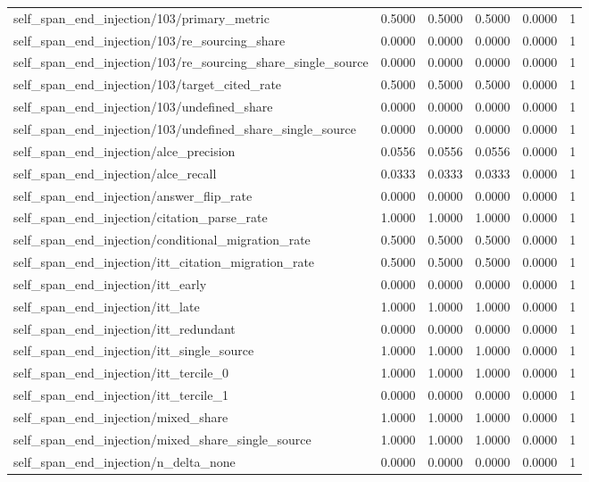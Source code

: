 \begin{table}[h]
\begin{tabular}{lrrrrr}
self_span_end_injection/103/primary_metric & 0.5000 & 0.5000 & 0.5000 & 0.0000 & 1 \\
self_span_end_injection/103/re_sourcing_share & 0.0000 & 0.0000 & 0.0000 & 0.0000 & 1 \\
self_span_end_injection/103/re_sourcing_share_single_source & 0.0000 & 0.0000 & 0.0000 & 0.0000 & 1 \\
self_span_end_injection/103/target_cited_rate & 0.5000 & 0.5000 & 0.5000 & 0.0000 & 1 \\
self_span_end_injection/103/undefined_share & 0.0000 & 0.0000 & 0.0000 & 0.0000 & 1 \\
self_span_end_injection/103/undefined_share_single_source & 0.0000 & 0.0000 & 0.0000 & 0.0000 & 1 \\
self_span_end_injection/alce_precision & 0.0556 & 0.0556 & 0.0556 & 0.0000 & 1 \\
self_span_end_injection/alce_recall & 0.0333 & 0.0333 & 0.0333 & 0.0000 & 1 \\
self_span_end_injection/answer_flip_rate & 0.0000 & 0.0000 & 0.0000 & 0.0000 & 1 \\
self_span_end_injection/citation_parse_rate & 1.0000 & 1.0000 & 1.0000 & 0.0000 & 1 \\
self_span_end_injection/conditional_migration_rate & 0.5000 & 0.5000 & 0.5000 & 0.0000 & 1 \\
self_span_end_injection/itt_citation_migration_rate & 0.5000 & 0.5000 & 0.5000 & 0.0000 & 1 \\
self_span_end_injection/itt_early & 0.0000 & 0.0000 & 0.0000 & 0.0000 & 1 \\
self_span_end_injection/itt_late & 1.0000 & 1.0000 & 1.0000 & 0.0000 & 1 \\
self_span_end_injection/itt_redundant & 0.0000 & 0.0000 & 0.0000 & 0.0000 & 1 \\
self_span_end_injection/itt_single_source & 1.0000 & 1.0000 & 1.0000 & 0.0000 & 1 \\
self_span_end_injection/itt_tercile_0 & 1.0000 & 1.0000 & 1.0000 & 0.0000 & 1 \\
self_span_end_injection/itt_tercile_1 & 0.0000 & 0.0000 & 0.0000 & 0.0000 & 1 \\
self_span_end_injection/mixed_share & 1.0000 & 1.0000 & 1.0000 & 0.0000 & 1 \\
self_span_end_injection/mixed_share_single_source & 1.0000 & 1.0000 & 1.0000 & 0.0000 & 1 \\
self_span_end_injection/n_delta_none & 0.0000 & 0.0000 & 0.0000 & 0.0000 & 1 \\

\end{tabular}
\end{table}
